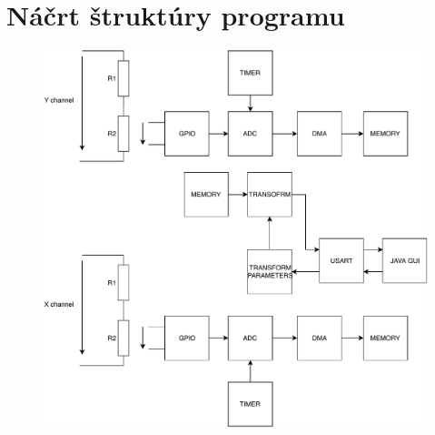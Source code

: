 \documentclass{article}
\begin{document}
\section{Náčrt štruktúry programu}

\begin{figure}[!h]
	\centering
	\includegraphics[width=\linewidth]{../Obrazky/basicstructure.pdf}
\end{figure}
	
	
\end{document}
